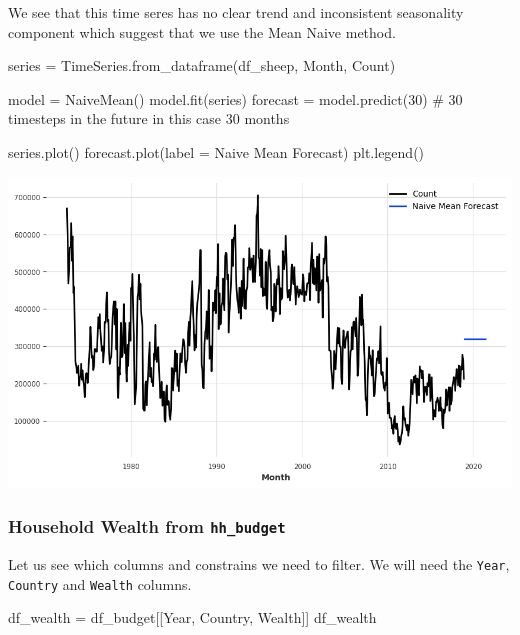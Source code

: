 \documentclass[
  11pt,
]{article}
\newenvironment{Shaded}{\begin{snugshade}}{\end{snugshade}}
\newcommand{\CommentTok}[1]{\textcolor[rgb]{0.37,0.37,0.37}{#1}}
\newcommand{\DecValTok}[1]{\textcolor[rgb]{0.68,0.00,0.00}{#1}}
\newcommand{\NormalTok}[1]{\textcolor[rgb]{0.00,0.23,0.31}{#1}}
\newcommand{\OperatorTok}[1]{\textcolor[rgb]{0.37,0.37,0.37}{#1}}
\newcommand{\StringTok}[1]{\textcolor[rgb]{0.13,0.47,0.30}{#1}}
\begin{document}
We see that this time seres has no clear trend and inconsistent
seasonality component which suggest that we use the Mean Naive method.

\begin{Shaded}
\begin{Highlighting}[]
\NormalTok{series }\OperatorTok{=}\NormalTok{ TimeSeries.from\_dataframe(df\_sheep, }\StringTok{\textquotesingle{}Month\textquotesingle{}}\NormalTok{, }\StringTok{\textquotesingle{}Count\textquotesingle{}}\NormalTok{)}

\NormalTok{model }\OperatorTok{=}\NormalTok{ NaiveMean() }
\NormalTok{model.fit(series)}
\NormalTok{forecast }\OperatorTok{=}\NormalTok{ model.predict(}\DecValTok{30}\NormalTok{) }\CommentTok{\# 30 timesteps in the future in this case 30 months}

\NormalTok{series.plot()}
\NormalTok{forecast.plot(label }\OperatorTok{=} \StringTok{\textquotesingle{}Naive Mean Forecast\textquotesingle{}}\NormalTok{)}
\NormalTok{plt.legend()}
\end{Highlighting}
\end{Shaded}

\includegraphics{hw3_files/figure-pdf/cell-19-output-1.png}

\subsubsection{\texorpdfstring{Household Wealth from
\texttt{hh\_budget}}{Household Wealth from hh\_budget}}\label{household-wealth-from-hh_budget}

Let us see which columns and constrains we need to filter. We will need
the \texttt{Year}, \texttt{Country} and \texttt{Wealth} columns.

\begin{Shaded}
\begin{Highlighting}[]
\NormalTok{df\_wealth }\OperatorTok{=}\NormalTok{ df\_budget[[}\StringTok{\textquotesingle{}Year\textquotesingle{}}\NormalTok{, }\StringTok{\textquotesingle{}Country\textquotesingle{}}\NormalTok{, }\StringTok{\textquotesingle{}Wealth\textquotesingle{}}\NormalTok{]]}
\NormalTok{df\_wealth}
\end{Highlighting}
\end{Shaded}
\end{document}
